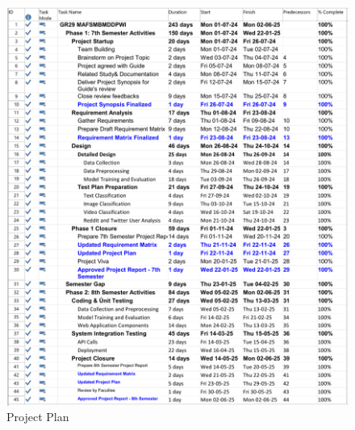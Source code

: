 \begin{figure}[h!]  
    \centering
    \includegraphics[width=1.0\textwidth]{Images/MS Project Plan Sem 7.png}  
    \caption{Project Plan}
    \label{Project Plan}  %
\end{figure}

\pagebreak

